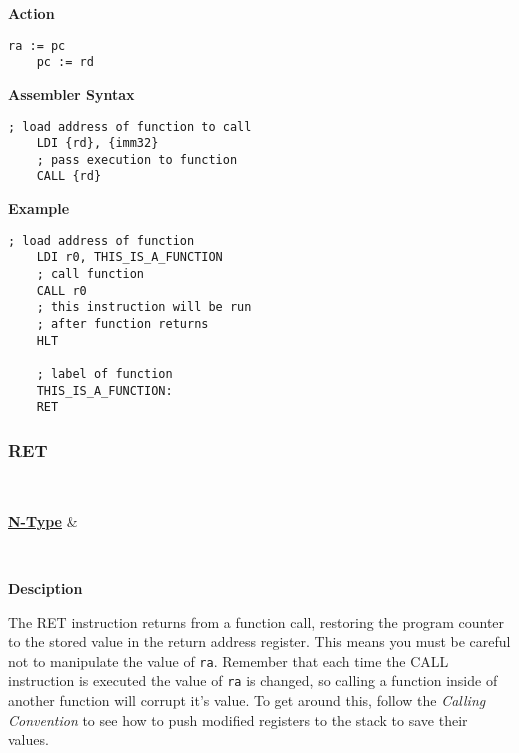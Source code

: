 \vspace{3ex}

\textbf{Action}
\begin{lstlisting}[frame=single]
	ra := pc
	pc := rd
\end{lstlisting}

\vspace{3ex}

\textbf{Assembler Syntax}
\begin{lstlisting}[frame=single]
	; load address of function to call
	LDI {rd}, {imm32}
	; pass execution to function
	CALL {rd}
\end{lstlisting}

\vspace{3ex}

\textbf{Example}
\begin{lstlisting}[frame=single]
	; load address of function
	LDI r0, THIS_IS_A_FUNCTION
	; call function
	CALL r0
	; this instruction will be run
	; after function returns
	HLT
	
	; label of function
	THIS_IS_A_FUNCTION:
	RET
\end{lstlisting}

\subsubsection{RET }\label{sec:RET}

\vspace{3ex}

\begin{center}
	\begin{bytefield}[leftcurly=., leftcurlyspace=0pt]{32}
		 \\
		\begin{leftwordgroup}{\hyperref[sec:n-type]{\textbf{N-Type}}}
		 & 
		\end{leftwordgroup}\\
	\end{bytefield}
\end{center}

\textbf{Desciption}

The RET instruction returns from a function call, restoring the program counter to the stored value in the return address register.
This means you must be careful not to manipulate the value of \texttt{ra}.
Remember that each time the CALL instruction is executed the value of \texttt{ra} is changed, so calling a function inside of another function will corrupt it's value.
To get around this, follow the \textit{Calling Convention} to see how to push modified registers to the stack to save their values.

